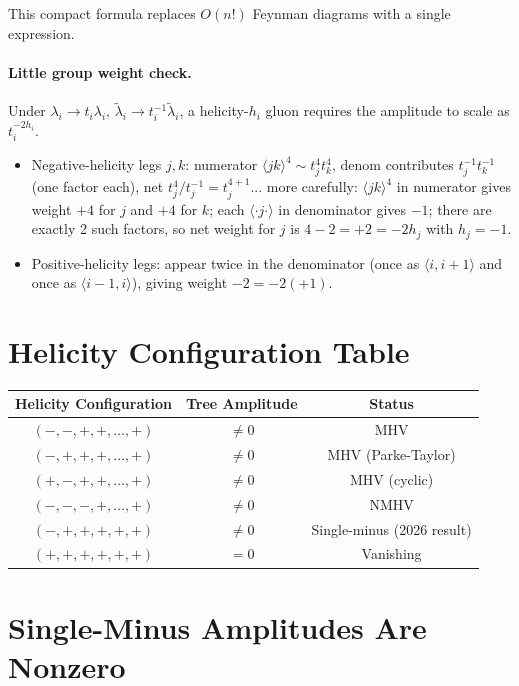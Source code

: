 This compact formula replaces $O(n!)$ Feynman diagrams with a single expression.

\paragraph{Little group weight check.}
Under $\lambda_i \to t_i \lambda_i$, $\tilde\lambda_i \to t_i^{-1}\tilde\lambda_i$, a helicity-$h_i$ gluon requires the amplitude to scale as $t_i^{-2h_i}$.
\begin{itemize}
  \item Negative-helicity legs $j,k$: numerator $\langle jk\rangle^4 \sim t_j^4 t_k^4$, denom contributes $t_j^{-1}t_k^{-1}$ (one factor each), net $t_j^4/t_j^{-1}=t_j^{4+1}$... more carefully: $\langle jk\rangle^4$ in numerator gives weight $+4$ for $j$ and $+4$ for $k$; each $\langle \cdot j\cdot\rangle$ in denominator gives $-1$; there are exactly 2 such factors, so net weight for $j$ is $4-2=+2 = -2h_j$ with $h_j=-1$. \checkmark
  \item Positive-helicity legs: appear twice in the denominator (once as $\langle i{,}i{+}1\rangle$ and once as $\langle i{-}1{,}i\rangle$), giving weight $-2 = -2(+1)$. \checkmark
\end{itemize}

\section{Helicity Configuration Table}

\begin{center}
\begin{tabular}{|c|c|c|}
\hline
Helicity Configuration & Tree Amplitude & Status \\
\hline
$(-,-,+,+,\ldots,+)$ & $\neq 0$ & MHV \\
$(-,+,+,+,\ldots,+)$ & $\neq 0$ & MHV (Parke-Taylor) \\
$(+,-,+,+,\ldots,+)$ & $\neq 0$ & MHV (cyclic) \\
$(-,-,-,+,\ldots,+)$ & $\neq 0$ & NMHV \\
$(-,+,+,+,+,+)$ & $\neq 0$ & Single-minus (2026 result) \\
$(+,+,+,+,+,+)$ & $= 0$ & Vanishing \\
\hline
\end{tabular}
\end{center}

\section{Single-Minus Amplitudes Are Nonzero}
\label{sec:single-minus}


